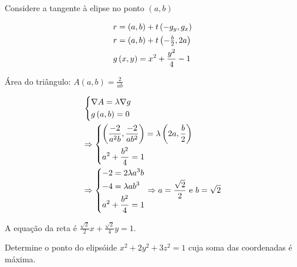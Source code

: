 \documentclass[11pt, oneside, a4paper]{gsm-l}
\begin{document}
\begin{sol}
Considere a tangente \`a elipse no ponto $(a,b)$


\[
\begin{gathered}
r = \left( {a,b} \right) + t\left( { - g_y ,g_x } \right) \hfill \\
r = \left( {a,b} \right) + t\left( { - \tfrac{b}{2},2a} \right) \hfill \\
g\left( {x,y} \right) = x^2  + \frac{{y^2 }}{4} - 1 \hfill \\
\end{gathered}
\]

Área do tri\^angulo: $A\left( {a,b} \right) = \displaystyle \frac{2}{{ab}}$

\[
\begin{gathered}
\left\{ \begin{gathered}
\nabla A = \lambda \nabla g \hfill \\
g\left( {a,b} \right) = 0 \hfill \\
\end{gathered}  \right. \hfill \\
\Rightarrow \left\{ \begin{gathered}
\left( {\frac{{ - 2}}
{{a^2 b}},\frac{{ - 2}}
{{ab^2 }}} \right) = \lambda \left( {2a,\frac{b}
{2}} \right) \hfill \\
a^2  + \frac{{b^2 }}
{4} = 1 \hfill \\
\end{gathered}  \right. \hfill \\
\Rightarrow \left\{ \begin{gathered}
- 2 = 2\lambda a^3 b \hfill \\
- 4 = \lambda ab^3  \hfill \\
a^2  + \frac{{b^2 }}
{4} = 1 \hfill \\
\end{gathered}  \right. \Rightarrow a = \frac{{\sqrt 2 }}
{2}{\text{ e }}b = \sqrt 2  \hfill \\
\end{gathered}
\]

A equação da reta é $\tfrac{{\sqrt 2 }}{2}x + \tfrac{{\sqrt 2 }}{4}y = 1$.

\end{sol}

\begin{exem}
    Determine o ponto do elips\'oide $x^2  + 2y^2  + 3z^2  = 1$ cuja soma das coordenadas é máxima.
\end{exem}
\end{document}
